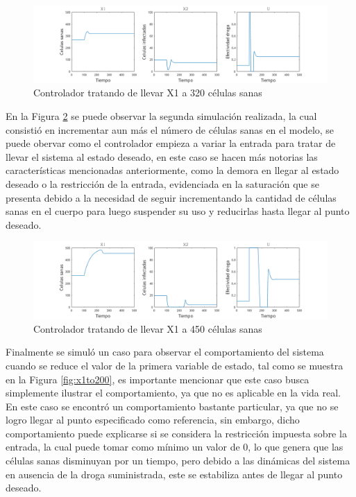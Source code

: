 \documentclass{article}
\begin{document}
\begin{figure}[H]
    \includegraphics[width=\textwidth]{Images/ControlX1Up.png}
    \caption{Controlador tratando de llevar X1 a 320 células sanas}
    \label{fig:x1to320}
\end{figure}

En la Figura \ref{fig:x1to450} se puede observar la segunda simulación
realizada, la cual consistió en incrementar aun más el número de células sanas
en el modelo, se puede obervar como el controlador empieza a variar la entrada
para tratar de llevar el sistema al estado deseado, en este caso se hacen más
notorias las características mencionadas anteriormente, como la demora en
llegar al estado deseado o la restricción de la entrada, evidenciada en la
saturación que se presenta debido a la necesidad de seguir incrementando la
cantidad de células sanas en el cuerpo para luego suspender su uso y reducirlas
hasta llegar al punto deseado.

\begin{figure}[H]
    \includegraphics[width=\textwidth]{Images/ControlX1Up2.png}
    \caption{Controlador tratando de llevar X1 a 450 células sanas}
    \label{fig:x1to450}
\end{figure}

Finalmente se simuló un caso para observar el comportamiento del sistema cuando
se reduce el valor de la primera variable de estado, tal como se muestra en la
Figura \ref{fig:x1to200}, es importante mencionar que este caso busca
simplemente ilustrar el comportamiento, ya que no es aplicable en la vida real.
En este caso se encontró un comportamiento bastante particular, ya que no se
logro llegar al punto especificado como referencia, sin embargo, dicho
comportamiento puede explicarse si se considera la restricción impuesta sobre
la entrada, la cual puede tomar como mínimo un valor de 0, lo que genera que
las células sanas disminuyan por un tiempo, pero debido a las dinámicas del
sistema en ausencia de la droga suministrada, este se estabiliza antes de
llegar al punto deseado.
\end{document}
